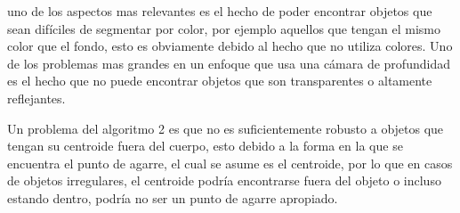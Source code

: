     uno de los aspectos mas relevantes es el hecho de poder encontrar objetos que sean difíciles de segmentar por color, por ejemplo aquellos que tengan el mismo color que el fondo, esto es obviamente debido al hecho que no utiliza colores.
    Uno de los problemas mas grandes en un enfoque que usa una cámara de profundidad es el hecho que no puede encontrar objetos que son transparentes o altamente reflejantes.
    
    
    Un problema del algoritmo 2 es que no es suficientemente robusto a objetos que tengan su centroide  fuera del cuerpo, esto debido a la forma en la que se encuentra el punto de agarre, el cual se asume es el centroide, por lo que en casos de objetos irregulares, el centroide podría encontrarse fuera del objeto o incluso estando dentro, podría no ser un punto de agarre apropiado.
    
    

    